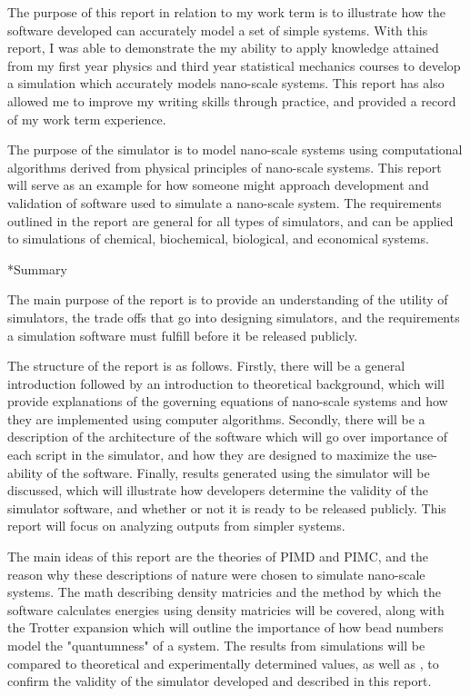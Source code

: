 \documentclass[11pt]{article}
\makeatletter
\let\workreportsection\section
\renewcommand{\section}{\@ifstar{\workreportstarsection}{\workreportsection}}
\newcommand{\workreportstarsection}[1]{\workreportsection*{#1}\addcontentsline{toc}{section}{#1}}
\makeatother
\begin{document}
The purpose of this report in relation to my work term is to illustrate how the software developed can accurately model a set of simple systems. With this report, I was able to demonstrate the my ability to apply knowledge attained from my first year physics and third year statistical mechanics courses to develop a simulation which accurately models nano-scale systems. This report has also allowed me to improve my writing skills through practice, and provided a record of my work term experience.

The purpose of the simulator is to model nano-scale systems using computational algorithms derived from physical principles of nano-scale systems. This report will serve as an example for how someone might approach development and validation of software used to simulate a nano-scale system. The requirements outlined in the report are general for all types of simulators, and can be applied to simulations of chemical, biochemical, biological, and economical systems.







\section*{Summary}
\label{wr-front-summary-1}

The main purpose of the report is to provide an understanding of the utility of simulators, the trade offs that go into designing simulators, and the requirements a simulation software must fulfill before it be released publicly. 

The structure of the report is as follows. Firstly, there will be a general introduction followed by an introduction to theoretical background, which will provide explanations of the governing equations of nano-scale systems and how they are implemented using computer algorithms. Secondly, there will be a description of the architecture of the software which will go over importance of each script in the simulator, and how they are designed to maximize the use-ability of the software. Finally, results generated using the simulator will be discussed, which will illustrate how developers determine the validity of the simulator software, and whether or not it is ready to be released publicly. This report will focus on analyzing outputs from simpler systems. 

The main ideas of this report are the theories of PIMD and PIMC, and the reason why these descriptions of nature were chosen to simulate nano-scale systems. The math describing density matricies and the method by which the software calculates energies using density matricies will be covered, along with the Trotter expansion which will outline the importance of how bead numbers model the "quantumness" of a system. The results from simulations will be compared to theoretical and experimentally determined values, as well as , to confirm the validity of the simulator developed and described in this report. 
\end{document}
